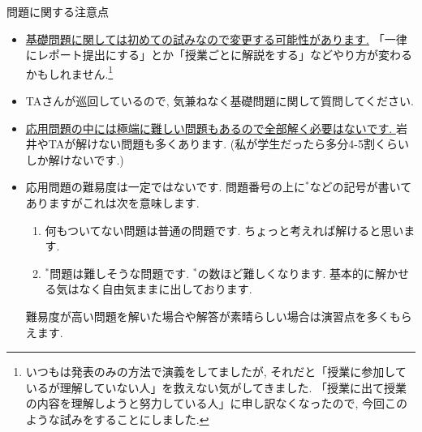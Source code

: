\documentclass[dvipdfmx,a4paper,11pt]{article}
\theoremstyle{definition}
\begin{document}
\hspace{-18pt}問題に関する注意点
\begin{itemize}
  \setlength{\parskip}{0cm} 
  \setlength{\itemsep}{0cm} 
  \item \underline{基礎問題に関しては初めての試みなので変更する可能性があります.} 「一律にレポート提出にする」とか「授業ごとに解説をする」などやり方が変わるかもしれません.\footnote{いつもは発表のみの方法で演義をしてましたが, それだと「授業に参加しているが理解していない人」を救えない気がしてきました. 「授業に出て授業の内容を理解しようと努力している人」に申し訳なくなったので, 今回このような試みをすることにしました. }
  \item TAさんが巡回しているので, 気兼ねなく基礎問題に関して質問してください. 
\item \underline{応用問題の中には極端に難しい問題もあるので全部解く必要はないです. } 岩井やTAが解けない問題も多くあります. (私が学生だったら多分4-5割くらいしか解けないです.)
\item 応用問題の難易度は一定ではないです. 問題番号の上に$^*$などの記号が書いてありますがこれは次を意味します.
\begin{enumerate}
  \setlength{\parskip}{0cm} 
  \setlength{\itemsep}{0cm} 
\item 何もついてない問題は普通の問題です. ちょっと考えれば解けると思います. %
\item $^{*}$問題は難しそうな問題です. $^*$の数ほど難しくなります.  基本的に解かせる気はなく自由気ままに出しております. %
\end{enumerate}
難易度が高い問題を解いた場合や解答が素晴らしい場合は演習点を多くもらえます.
\end{itemize}

\end{document}
